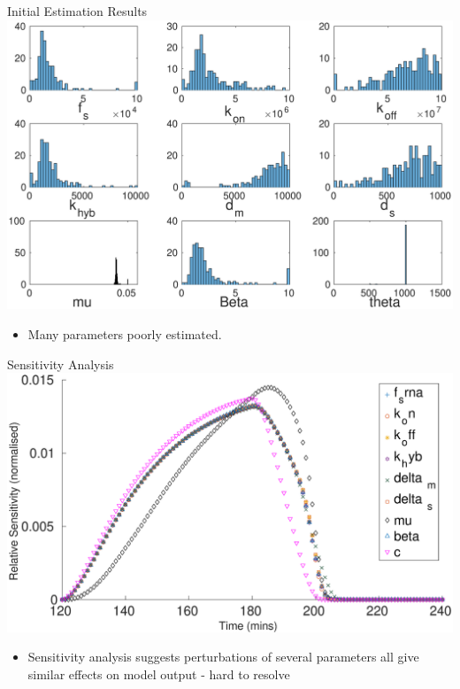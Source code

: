 \documentclass{beamer}
\begin{document}
\begin{frame}{Initial Estimation Results}
  \includegraphics[scale = 0.28, clip = true, trim = 130 0 0 0]{Figures/13_9_hist}
        \begin{itemize}
    \item Many parameters poorly estimated.
            \end{itemize}
\end{frame}

\begin{frame}{Sensitivity Analysis}
  \includegraphics[scale = 0.25, clip = true, trim = 00 0 0 0]{Figures/Sensitivty_scaled_other}
  \vspace{-2mm}
          \begin{itemize}
    \item Sensitivity analysis suggests perturbations of several parameters all give similar effects on model output - \alert{hard to resolve}
            \end{itemize}
\end{frame}
\end{document}
